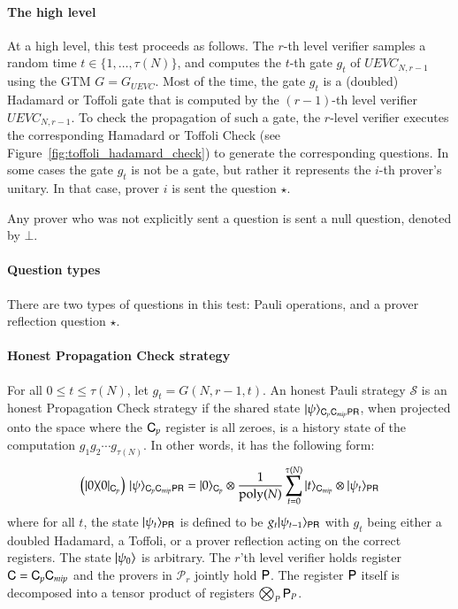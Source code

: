 \paragraph{The high level}  At a high level, this test  proceeds as follows. The $r$-th level verifier samples a random time $t \in \{1,\ldots,\tau(N)\}$, and computes the $t$-th gate $g_t$ of $UEVC_{N,r-1}$ using the GTM $G = G_{UEVC}$. Most of the time, the gate $g_t$ is a (doubled) Hadamard or Toffoli gate that is computed by the $(r-1)$-th level verifier $UEVC_{N,r-1}$. To check the propagation of such a gate, the $r$-level verifier executes the corresponding Hamadard or Toffoli Check (see Figure~\ref{fig:toffoli_hadamard_check}) to generate the corresponding questions. %
In some cases the gate $g_t$ is not be a gate, but rather it represents the $i$-th prover's unitary. In that case, prover $i$ is sent the question $\star$.  

Any prover who was not explicitly sent a question is sent a null question, denoted by $\bot$.

\paragraph{Question types} There are two types of questions in this test: Pauli operations, and a prover reflection question $\star$.


\paragraph{Honest Propagation Check strategy} For all $0 \leq t \leq \tau(N)$, let $g_t = G(N,r-1,t)$. An honest Pauli strategy $\mathcal{S}$ is an honest Propagation Check strategy if the shared state $|\psi\rangle_{{\mathsf{C}}_p {\mathsf{C}}_{mip} {\mathsf{P}} {\mathsf{R}}}$, when projected onto the space where the ${\mathsf{C}}_p$ register is all zeroes, is a history state of the computation $g_1g_2\cdots g_{\tau(N)}$. In other words, it has the following form:
\[
	\left( |0\rangle\! \langle 0|_{{\mathsf{C}}_p} \right) \, |\psi\rangle_{{\mathsf{C}}_p {\mathsf{C}}_{mip} {\mathsf{P}} {\mathsf{R}}} = |0\rangle_{{\mathsf{C}}_p} \otimes \frac{1}{\operatorname{poly}(N)} \sum_{t = 0}^{\tau(N)} |t\rangle_{{\mathsf{C}}_{mip}} \otimes |\psi_t\rangle_{{\mathsf{P}} {\mathsf{R}}}
\]
where for all $t$, the state $|\psi_t\rangle_{{\mathsf{P}} {\mathsf{R}}}$ is defined to be $g_t |\psi_{t-1}\rangle_{{\mathsf{P}} {\mathsf{R}}}$ with $g_t$ being either a doubled Hadamard, a Toffoli, or a prover reflection acting on the correct registers. The state $|\psi_0\rangle$ is arbitrary. The $r$'th level verifier holds register ${\mathsf{C}} = {\mathsf{C}}_p {\mathsf{C}}_{mip}$ and the provers in $\mathcal{P}_r$ jointly hold ${\mathsf{P}}$. The register ${\mathsf{P}}$ itself is decomposed into a tensor product of registers $\bigotimes_P {\mathsf{P}}_P$. 

